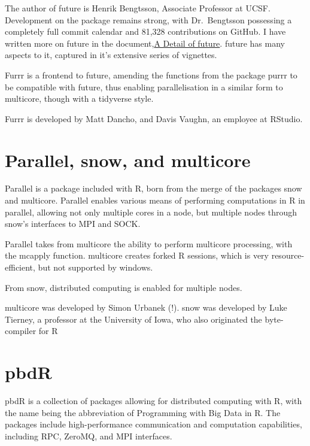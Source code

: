 \documentclass[10pt,a4paper]{article}
\begin{document}
The author of future is Henrik Bengtsson, Associate Professor at UCSF.
Development on the package remains strong, with Dr.~Bengtsson
possessing a completely full commit calendar and 81,328 contributions
on GitHub. I have written more on future in the
document,\href{detail-future.pdf}{A Detail of future}. future has many
aspects to it, captured in it's extensive series of
vignettes\cite{bengtsson20:_futur_r}\cite{bengtsson20:_futur_r2}\cite{bengtsson20:_futur_r3}\cite{bengtsson20:_futur_r4}\cite{bengtsson20:_futur_r5}\cite{bengtsson20:_futur_r6}.

Furrr is a frontend to future, amending the functions from the package
purrr to be compatible with future, thus enabling parallelisation in a
similar form to multicore, though with a tidyverse
style\cite{vaughan18}.

Furrr is developed by Matt Dancho, and Davis Vaughn, an employee at
RStudio.

\section{Parallel, snow, and multicore}
\label{sec:parall-snow-mult}
Parallel is a package included with R, born from the merge of the
packages snow and multicore\cite{core:_packag}. Parallel enables
various means of performing computations in R in parallel, allowing
not only multiple cores in a node, but multiple nodes through snow's
interfaces to MPI and SOCK\cite{tierney18}.

Parallel takes from multicore the ability to perform multicore
processing, with the mcapply function. multicore creates forked R
sessions, which is very resource-efficient, but not supported by
windows.

From snow, distributed computing is enabled for multiple nodes.

multicore was developed by Simon Urbanek (!). snow was developed by
Luke Tierney, a professor at the University of Iowa, who also
originated the byte-compiler for R

\section{pbdR}
\label{sec:pbdr}

pbdR is a collection of packages allowing for distributed computing
with R\cite{pbdBASEpackage}, with the name being the abbreviation of
Programming with Big Data in R. The packages include high-performance
communication and computation capabilities, including RPC, ZeroMQ, and
MPI interfaces.
\end{document}
